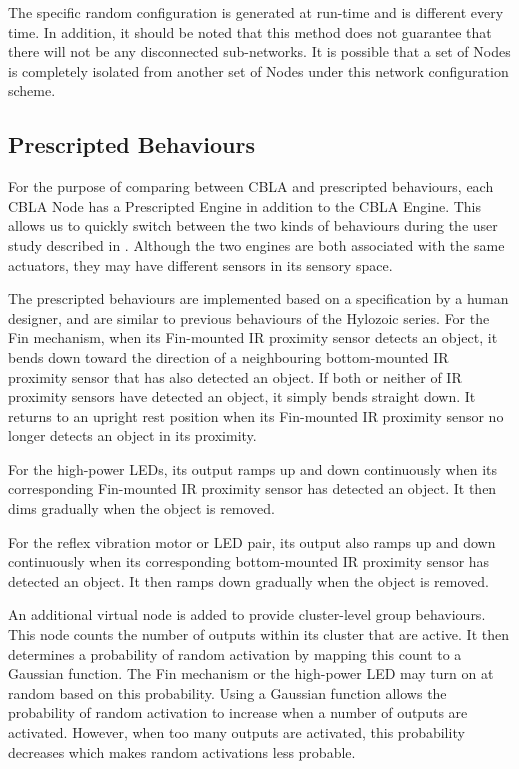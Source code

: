 The specific random configuration is generated at run-time and is different every time. In addition, it should be noted that this method does not guarantee that there will not be any disconnected sub-networks. It is possible that a set of Nodes is completely isolated from another set of Nodes under this network configuration scheme.

\subsection{Prescripted Behaviours}\label{sec:prescripted-behaviours}

For the purpose of comparing between CBLA and prescripted behaviours, each CBLA Node has a Prescripted Engine in addition to the CBLA Engine. This allows us to quickly switch between the two kinds of behaviours during the user study described in . Although the two engines are both associated with the same actuators, they may have different sensors in its sensory space. 

The prescripted behaviours are implemented based on a specification by a human designer, and are similar to previous behaviours of the Hylozoic series\cite{Gorbet2015}. For the Fin mechanism, when its Fin-mounted IR proximity sensor detects an object, it bends down toward the direction of a neighbouring bottom-mounted IR proximity sensor that has also detected an object. If both or neither of IR proximity sensors have detected an object, it simply bends straight down. It returns to an upright rest position when its Fin-mounted IR proximity sensor no longer detects an object in its proximity.

For the high-power LEDs, its output ramps up and down continuously when its corresponding Fin-mounted IR proximity sensor has detected an object. It then dims gradually when the object is removed.

For the reflex vibration motor or LED pair, its output also ramps up and down continuously when its corresponding bottom-mounted IR proximity sensor has detected an object. It then ramps down gradually when the object is removed.

An additional virtual node is added to provide cluster-level group behaviours. This node counts the number of outputs within its cluster that are active. It then determines a probability of random activation by mapping this count to a Gaussian function. The Fin mechanism or the high-power LED may turn on at random based on this probability. Using a Gaussian function allows the probability of random activation to increase when a number of outputs are activated. However, when too many outputs are activated, this probability decreases which makes random activations less probable. 

